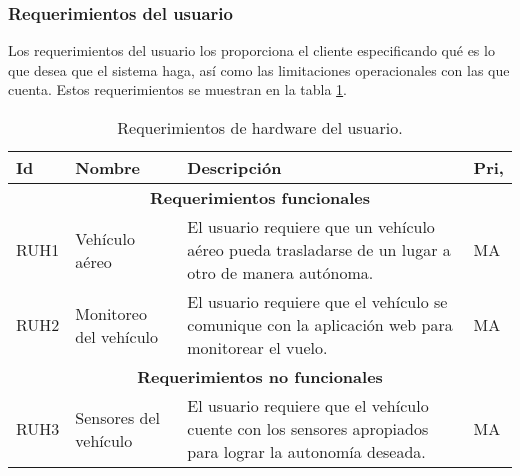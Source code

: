 %

\subsubsection{Requerimientos del usuario}

Los requerimientos del usuario los proporciona el cliente especificando qué es 
lo que desea que el sistema haga, así como las limitaciones operacionales con 
las que cuenta. Estos requerimientos se muestran en la tabla 
\ref{tab:req:hard:usuario}.

\begin{table}[H]
	\centering
	\caption{Requerimientos de hardware del usuario.}
	\label{tab:req:hard:usuario}
	\begin{tabular}{ | l | l | p{6.5cm} | l |}
		\hline
		\textbf{Id} & \textbf{Nombre} & \textbf{Descripción} & 
		\textbf{Pri,}
		\\\hline
		\multicolumn{4}{|c|}{\textbf{Requerimientos funcionales}} 
		\\\hline
		RUH1 & Vehículo aéreo & El usuario requiere que un vehículo 
		aéreo pueda trasladarse de un lugar a otro de manera autónoma. 
		& MA \\\hline
		RUH2 & Monitoreo del vehículo & El usuario requiere que el 
		vehículo se comunique con la aplicación web para monitorear el 
		vuelo. & MA \\\hline
		\multicolumn{4}{|c|}{\textbf{Requerimientos no funcionales}} 
		\\\hline
		RUH3 & Sensores del vehículo & El usuario requiere que el 
		vehículo cuente con los sensores apropiados para lograr la 
		autonomía deseada. 
		& MA \\\hline
	\end{tabular}
\end{table}
